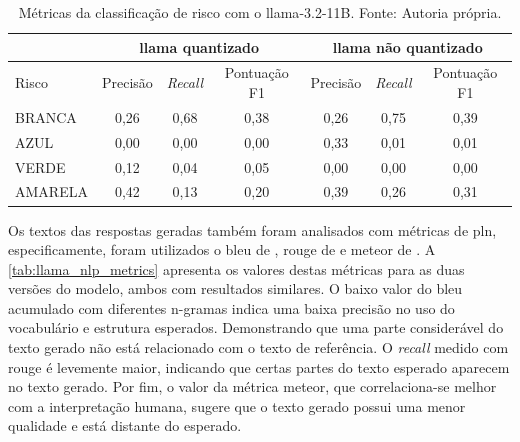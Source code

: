 \begin{table}[ht]
    \centering
    \begin{tabular}{l|c|c|c|c|c|c}
        \hline
                        & \multicolumn{3}{c|}{\ac{llama} quantizado} & \multicolumn{3}{c}{\ac{llama} não
        quantizado}
        \\ \hline
        Risco           & Precisão                                   & \textit{Recall}
                        & Pontuação F1                               & Precisão                          &
        \textit{Recall} & Pontuação F1
        \\ \hline
        BRANCA          & 0,26                                       & 0,68
                        & 0,38                                       & 0,26                              & 0,75
                        & 0,39
        \\
        AZUL            & 0,00                                       & 0,00
                        & 0,00                                       & 0,33                              & 0,01
                        & 0,01
        \\
        VERDE           & 0,12                                       & 0,04
                        & 0,05                                       & 0,00                              & 0,00
                        & 0,00
        \\
        AMARELA         & 0,42                                       & 0,13
                        & 0,20                                       & 0,39                              & 0,26
                        & 0,31
        \\ \hline
    \end{tabular}
    \label{tab:llama_risk_classification_report}
    \caption{Métricas da classificação de risco com o \ac{llama}-3.2-11B. Fonte: Autoria própria.}
\end{table}

Os textos das respostas geradas também foram analisados com métricas de \ac{pln}, especificamente, foram utilizados o
\ac{bleu} de \textcite{papineni2002bleu}, \ac{rouge} de \textcite{lin2004rouge} e \ac{meteor} de
\textcite{denkowski2014meteor}. A \autoref{tab:llama_nlp_metrics} apresenta os valores destas métricas para as
duas versões do modelo, ambos com resultados similares. O baixo valor do \ac{bleu} acumulado com diferentes n-gramas
indica uma baixa precisão no uso do vocabulário e estrutura esperados. Demonstrando que uma parte considerável do texto
gerado não está relacionado com o texto de referência. O \textit{recall} medido com \ac{rouge} é levemente maior,
indicando que certas partes do texto esperado aparecem no texto gerado. Por fim, o valor da métrica \ac{meteor}, que
correlaciona-se melhor com a interpretação humana, sugere que o texto gerado possui uma menor qualidade e está distante
do esperado.


